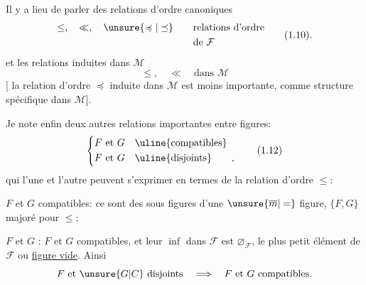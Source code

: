  Il y a lieu de parler des relations d'ordre canoniques
\[
\begin{aligned}
\leq,\quad\ll,\quad\unsure{\preccurlyeq|\preceq}&\qquad\text{relations d'ordre}\\
&\qquad\text{de }\mathcal{F}
\end{aligned}\tag*{(1.10).}
\]
et les relations induites dans $\mathcal{M}$
\[
\leq,\quad\ll\quad\text{dans }\mathcal{M}\tag*{(1.11)}
\]
[ la relation d'ordre $\preccurlyeq$ induite dans $\mathcal{M}$ est moins importante, comme structure spécifique dans $\mathcal{M}$].


Je note enfin deux autres relations importantes  entre figures:
\[
\left\{\begin{aligned}
F\text{ et }G&\quad\text{\uline{compatibles}}\\
F\text{ et }G&\quad\text{\uline{disjoints}}\qquad,
\end{aligned}\right.\tag*{(1.12)}
\]
qui l'une et l'autre peuvent s'exprimer en termes de la relation d'ordre $\leq$:

$F$ et $G$ compatibles: ce sont des sous figures d'une $\unsure{\overline m|=}$ figure,  $\{F,G\}$ majoré pour $\leq$;

$F$ et $G$ : $F$ et $G$ compatibles, et leur
$\inf$ dans $\mathcal{F}$ est $\varnothing_{\mathcal{F}}$, le plus petit élément de $\mathcal{F}$ ou \uline{figure vide}. Ainsi
\[
F\text{ et }\unsure{G|C}\text{ disjoints}\quad\Longrightarrow\quad F\text{ et }G\text{ compatibles}.
\]

